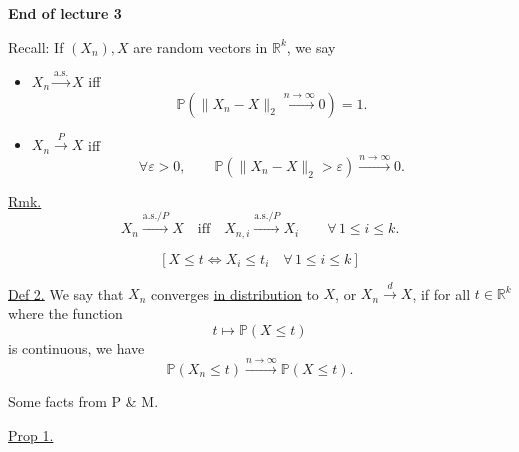 \documentclass[11pt,a4paper]{article}
\begin{document}
\begin{center}
\textbf{End of lecture 3}
\end{center}\noindent
Recall: If $(X_n),X$ are random vectors in $\mathbb{R}^k$, we say
\begin{itemize}
    \item
    $X_n \xrightarrow{\mathrm{a.s.}} X$ iff
    \[
    \mathbb{P}\left(
    \|X_n-X\|_2 \xrightarrow{n\to\infty} 0
    \right)=1.
    \]

    \item
    $X_n \xrightarrow{P} X$ iff
    \[
    \forall \varepsilon>0,\qquad
    \mathbb{P}\left(\|X_n-X\|_2>\varepsilon\right)
    \xrightarrow{n\to\infty}0.
    \]
\end{itemize}

\noindent
\underline{Rmk.}
\[
X_n \xrightarrow{\mathrm{a.s.}/P} X
\quad\text{iff}\quad
X_{n,i} \xrightarrow{\mathrm{a.s.}/P} X_i
\qquad \forall\,1\leq i\leq k.
\]

\[
\left[
X\leq t
\iff
X_i\leq t_i
\quad \forall\,1\leq i\leq k
\right]
\]

\noindent
\underline{Def 2.}
We say that $X_n$ converges \underline{in distribution} to $X$,
or $X_n\xrightarrow{d}X$, if for all $t\in\mathbb{R}^k$
where the function
\[
t\mapsto\mathbb{P}(X\leq t)
\]
is continuous, we have
\[
\mathbb{P}(X_n\leq t)
\xrightarrow{n\to\infty}
\mathbb{P}(X\leq t).
\]

\medskip
\noindent
Some facts from P \& M.

\medskip
\noindent
\underline{Prop 1.}
\end{document}
